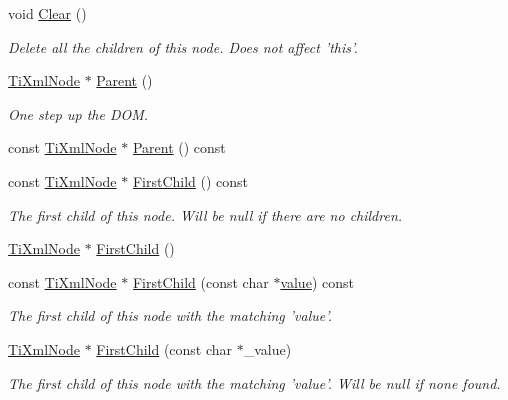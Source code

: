 \begin{DoxyCompactItemize}
void \hyperlink{classTiXmlNode_a708e7f953df61d4d2d12f73171550a4b}{Clear} ()
\begin{DoxyCompactList}\small\item\em Delete all the children of this node. Does not affect 'this'. \item\end{DoxyCompactList}\item 
\hyperlink{classTiXmlNode}{TiXmlNode} $\ast$ \hyperlink{classTiXmlNode_ab643043132ffd794f8602685d34a982e}{Parent} ()
\begin{DoxyCompactList}\small\item\em One step up the DOM. \item\end{DoxyCompactList}\item 
const \hyperlink{classTiXmlNode}{TiXmlNode} $\ast$ \hyperlink{classTiXmlNode_a78878709e53066f06eb4fcbcdd3a5260}{Parent} () const 
\item 
const \hyperlink{classTiXmlNode}{TiXmlNode} $\ast$ \hyperlink{classTiXmlNode_a44c8eee26bbe2d1b2762038df9dde2f0}{FirstChild} () const 
\begin{DoxyCompactList}\small\item\em The first child of this node. Will be null if there are no children. \item\end{DoxyCompactList}\item 
\hyperlink{classTiXmlNode}{TiXmlNode} $\ast$ \hyperlink{classTiXmlNode_a5e97d69b7c0ebd27fb7286be56559b77}{FirstChild} ()
\item 
const \hyperlink{classTiXmlNode}{TiXmlNode} $\ast$ \hyperlink{classTiXmlNode_ab5f722624113c8203227de4f56576d31}{FirstChild} (const char $\ast$\hyperlink{classTiXmlNode_aead528b3cedc33c16a6c539872c7cc8b}{value}) const 
\begin{DoxyCompactList}\small\item\em The first child of this node with the matching 'value'. \item\end{DoxyCompactList}\item 
\hyperlink{classTiXmlNode}{TiXmlNode} $\ast$ \hyperlink{classTiXmlNode_abc8bf32be6419ec453a731868de19554}{FirstChild} (const char $\ast$\_\-value)
\begin{DoxyCompactList}\small\item\em The first child of this node with the matching 'value'. Will be null if none found. \item\end{DoxyCompactList}\item 

\end{DoxyCompactItemize}

